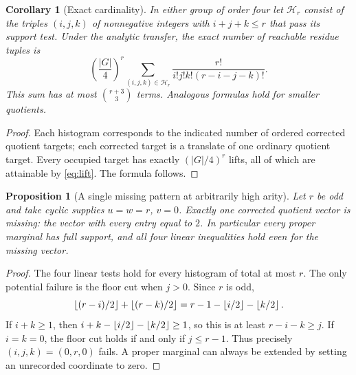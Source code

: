 \documentclass[11pt]{article}
\newtheorem{corollary}[theorem]{Corollary}
\newtheorem{proposition}[theorem]{Proposition}
\theoremstyle{remark}\newtheorem{remark}[theorem]{Remark}
\begin{document}
\begin{corollary}[Exact cardinality]
In either group of order four let $\mathcal H_r$ consist of the triples $(i,j,k)$ of nonnegative integers with $i+j+k\le r$ that pass its support test. Under the analytic transfer, the exact number of reachable residue tuples is
\begin{equation}\label{eq:card}
 \left(\frac{|G|}{4}\right)^r
 \sum_{(i,j,k)\in\mathcal H_r}\frac{r!}{i!j!k!(r-i-j-k)!}.
\end{equation}
This sum has at most $\binom{r+3}{3}$ terms. Analogous formulas hold for smaller quotients.
\end{corollary}
\begin{proof}
Each histogram corresponds to the indicated number of ordered corrected quotient targets; each corrected target is a translate of one ordinary quotient target. Every occupied target has exactly $(|G|/4)^r$ lifts, all of which are attainable by \eqref{eq:lift}. The formula follows.
\end{proof}

\begin{proposition}[A single missing pattern at arbitrarily high arity]\label{prop:missing}
Let $r$ be odd and take cyclic supplies $u=w=r$, $v=0$. Exactly one corrected quotient vector is missing: the vector with every entry equal to $2$. In particular every proper marginal has full support, and all four linear inequalities hold even for the missing vector.
\end{proposition}
\begin{proof}
The four linear tests hold for every histogram of total at most $r$. The only potential failure is the floor cut when $j>0$. Since $r$ is odd,
\[
 \left\lfloor (r-i)/2\right\rfloor+\left\lfloor (r-k)/2\right\rfloor=r-1-\left\lfloor i/2\right\rfloor-\left\lfloor k/2\right\rfloor.
\]
If $i+k\ge1$, then $i+k-\left\lfloor i/2\right\rfloor-\left\lfloor k/2\right\rfloor\ge1$, so this is at least $r-i-k\ge j$. If $i=k=0$, the floor cut holds if and only if $j\le r-1$. Thus precisely $(i,j,k)=(0,r,0)$ fails. A proper marginal can always be extended by setting an unrecorded coordinate to zero.
\end{proof}
\end{document}
